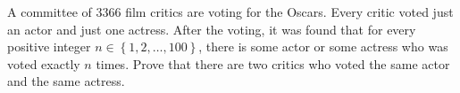 A committee of $3366$ film critics are voting for the Oscars. Every critic voted just an actor and just one actress. After the voting, it was found that for every positive integer $n \in \left \{1, 2, \ldots, 100 \right \}$,  there is some actor or some actress who was voted exactly $n$ times. Prove that there are two critics who voted the same actor and the same actress.
